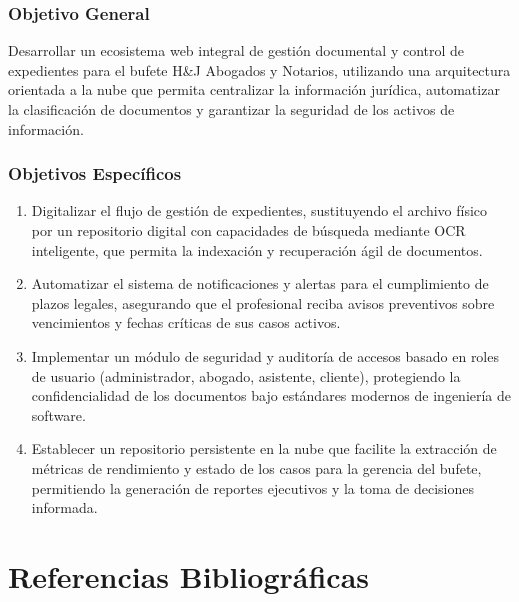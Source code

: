 \documentclass[12pt, letterpaper]{article}
\begin{document}
\subsubsection{Objetivo General}
Desarrollar un ecosistema web integral de gestión documental y control de expedientes para el bufete H\&J Abogados y Notarios, utilizando una arquitectura orientada a la nube que permita centralizar la información jurídica, automatizar la clasificación de documentos y garantizar la seguridad de los activos de información.

\subsubsection{Objetivos Específicos}

\begin{enumerate}
    \item Digitalizar el flujo de gestión de expedientes, sustituyendo el archivo físico por un repositorio digital con capacidades de búsqueda mediante OCR inteligente, que permita la indexación y recuperación ágil de documentos.

    \item Automatizar el sistema de notificaciones y alertas para el cumplimiento de plazos legales, asegurando que el profesional reciba avisos preventivos sobre vencimientos y fechas críticas de sus casos activos.

    \item Implementar un módulo de seguridad y auditoría de accesos basado en roles de usuario (administrador, abogado, asistente, cliente), protegiendo la confidencialidad de los documentos bajo estándares modernos de ingeniería de software.

    \item Establecer un repositorio persistente en la nube que facilite la extracción de métricas de rendimiento y estado de los casos para la gerencia del bufete, permitiendo la generación de reportes ejecutivos y la toma de decisiones informada.
\end{enumerate}

\newpage
\section{Referencias Bibliográficas}
\end{document}
